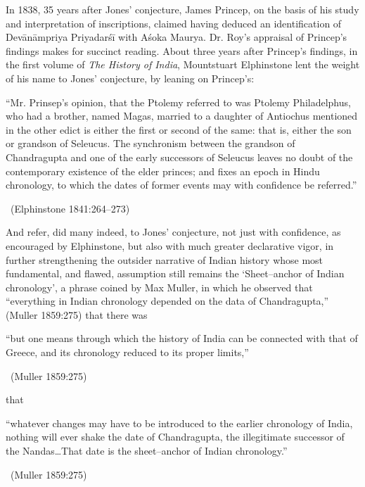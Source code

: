 In 1838, 35 years after Jones’ conjecture, James Princep, on the basis of his study and interpretation of inscriptions, claimed having deduced an identification of Devānāmpriya Priyadarśī with Aśoka Maurya. Dr. Roy’s appraisal of Princep’s findings makes for succinct reading. About three years after Princep’s findings, in the first volume of \textit{The History of India}, Mountstuart Elphinstone lent the weight of his name to Jones’ conjecture, by leaning on Princep’s:

\begin{myquote}
“Mr. Prinsep’s opinion, that the Ptolemy referred to was Ptolemy Philadelphus, who had a brother, named Magas, married to a daughter of Antiochus mentioned in the other edict is either the first or second of the same: that is, either the son or grandson of Seleucus. The synchronism between the grandson of Chandragupta and one of the early successors of Seleucus leaves no doubt of the contemporary existence of the elder princes; and fixes an epoch in Hindu chronology, to which the dates of former events may with confidence be referred.” 

~\hfill (Elphinstone 1841:264–273)
\end{myquote}

And refer, did many indeed, to Jones’ conjecture, not just with confidence, as encouraged by Elphinstone, but also with much greater declarative vigor, in further strengthening the outsider narrative of Indian history whose most fundamental, and flawed, assumption still remains the ‘Sheet–anchor of Indian chronology’, a phrase coined by Max Muller, in which he observed that “everything in Indian chronology depended on the data of Chandragupta,” (Muller 1859:275) that there was

\begin{myquote}
“but one means through which the history of India can be connected with that of Greece, and its chronology reduced to its proper limits,” 

~\hfill (Muller 1859:275)
\end{myquote}

that

\begin{myquote}
“whatever changes may have to be introduced to the earlier chronology of India, nothing will ever shake the date of Chandragupta, the illegitimate successor of the Nandas…That date is the sheet–anchor of Indian chronology.” 

~\hfill (Muller 1859:275)
\end{myquote}

